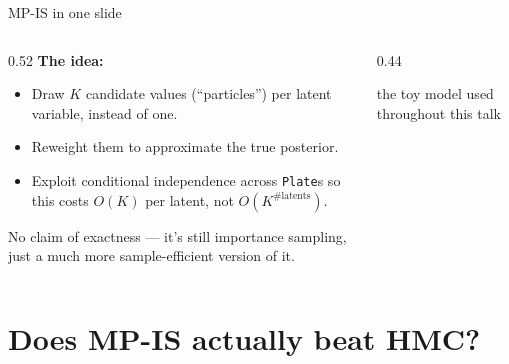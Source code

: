 \documentclass[aspectratio=169]{beamer}
\begin{document}
\begin{frame}{MP-IS in one slide}
  \begin{columns}[T]
    \begin{column}{0.52\textwidth}
      \textbf{The idea:}
      \begin{itemize}
        \item Draw $K$ candidate values (``particles'') per latent variable,
          instead of one.
        \item Reweight them to approximate the true posterior.
        \item Exploit conditional independence across \texttt{Plate}s so
          this costs $O(K)$ per latent, not $O(K^{\text{\#latents}})$.
      \end{itemize}
      No claim of exactness --- it's still importance sampling, just a much
      more sample-efficient version of it.
    \end{column}
    \begin{column}{0.44\textwidth}
      \begin{center}
      \end{center}
      \begin{center}\scriptsize the toy model used throughout this talk\end{center}
    \end{column}
  \end{columns}
\end{frame}

\section{Does MP-IS actually beat HMC?}
\end{document}
